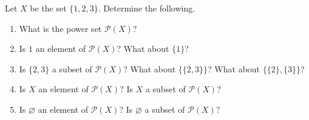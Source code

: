 \documentclass[../notes.tex]{subfiles}
\begin{document}
\begin{exercise}
    Let $X$ be the set $\{1, 2, 3\}$. Determine the following.
    \begin{enumerate}[label=(\alph*)]
        \item What is the power set $\mathcal{P}(X)$?
        \item Is $1$ an element of $\mathcal{P}(X)$? What about $\{1\}$?
        \item Is $\{2, 3\}$ a subset of $\mathcal{P}(X)$? What about $\{\{2, 3\}\}$? What about $\{\{2\}, \{3\}\}$?
        \item Is $X$ an element of $\mathcal{P}(X)$? Is $X$ a subset of $\mathcal{P}(X)$?
        \item Is $\varnothing$ an element of $\mathcal{P}(X)$? Is $\varnothing$ a subset of $\mathcal{P}(X)$?
    \end{enumerate}
\end{exercise}
\end{document}
